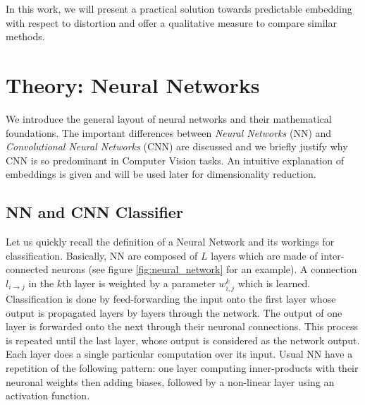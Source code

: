 \documentclass[a4paper,12pt]{report}
\begin{document}
In this work, we will present a practical solution towards predictable embedding with respect to distortion and offer a qualitative measure to compare similar methods. %


\chapter{Theory: Neural Networks}
\label{chap:neural_network}
We introduce the general layout of neural networks and their mathematical foundations.
The important differences between {\em Neural Networks} (NN) and {\em Convolutional Neural Networks} (CNN) are discussed and we briefly justify why CNN is so predominant in Computer Vision tasks.
An intuitive explanation of embeddings is given and will be used later for dimensionality reduction.

\section{NN and CNN Classifier}

Let us quickly recall the definition of a Neural Network and its workings for classification.
Basically, NN are composed of $L$ layers which are made of inter-connected neurons (see figure \ref{fig:neural_network} for an example).
A connection $l_{i \rightarrow j}$ in the $k$th layer is weighted by a parameter $w^k_{i,j}$ which is learned.
Classification is done by feed-forwarding the input onto the first layer whose output is propagated layers by layers through the network.
The output of one layer is forwarded onto the next through their neuronal connections.
This process is repeated until the last layer, whose output is considered as the network output.
Each layer does a single particular computation over its input.
Usual NN have a repetition of the following pattern: one layer computing inner-products with their neuronal weights then adding biases, followed by a non-linear layer using an activation function.
\end{document}
